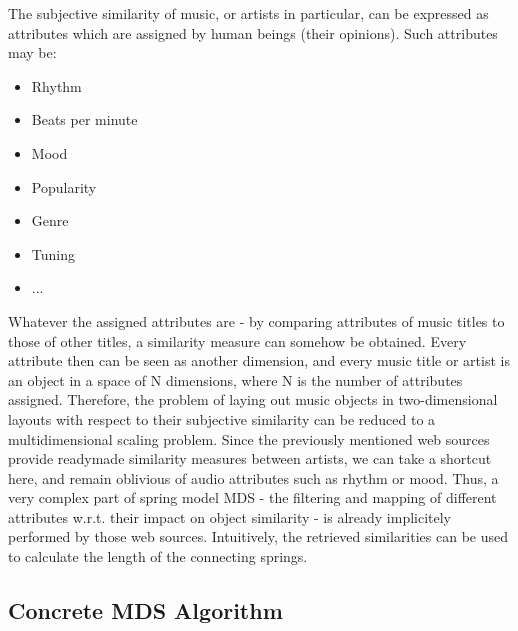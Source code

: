 The subjective similarity of music, or artists in particular, can be expressed as attributes which are assigned by human beings (their opinions). Such attributes may be:

\begin{itemize}
	\item Rhythm
	\item Beats per minute
	\item Mood
	\item Popularity
	\item Genre
	\item Tuning
	\item ...
\end{itemize}

Whatever the assigned attributes are - by comparing attributes of music titles to those of other titles, a similarity measure can somehow be obtained. Every attribute then can be seen as another dimension, and every music title or artist is an object in a space of N dimensions, where N is the number of attributes assigned.
Therefore, the problem of laying out music objects in two-dimensional layouts with respect to their subjective similarity can be reduced to a multidimensional scaling problem.
Since the previously mentioned web sources provide readymade similarity measures between artists, we can take a shortcut here, and remain oblivious of audio attributes such as rhythm or mood. Thus, a very complex part of spring model MDS - the filtering and mapping of different attributes w.r.t. their impact on object similarity - is already implicitely performed by those web sources. Intuitively, the retrieved similarities can be used to calculate the length of the connecting springs.

\subsection{Concrete MDS Algorithm}

